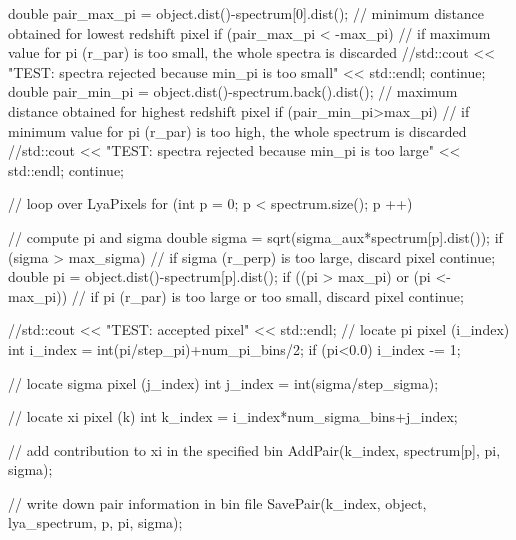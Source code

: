 \begin{DoxyCode}
{{{{                double pair_max_pi = object.dist()-spectrum[0].dist(); //
       minimum distance obtained for lowest redshift pixel
                if (pair_max_pi < -max_pi) { // if maximum value for pi (r_par)
       is too small, the whole spectra is discarded
                    //std::cout << "TEST: spectra rejected because min_pi is
       too small" << std::endl;
                    continue;
                }
                double pair_min_pi = object.dist()-spectrum.back().dist(); //
       maximum distance obtained for highest redshift pixel
                if (pair_min_pi>max_pi){ // if minimum value for pi (r_par) is
       too high, the whole spectrum is discarded
                    //std::cout << "TEST: spectra rejected because min_pi is
       too large" << std::endl;
                    continue;
                }
                
                // loop over LyaPixels
                for (int p = 0; p < spectrum.size(); p ++){
                    
                    // compute pi and sigma
                    double sigma = sqrt(sigma_aux*spectrum[p].dist());
                    if (sigma > max_sigma){ // if sigma (r_perp) is too large,
       discard pixel
                        continue;
                    }
                    double pi = object.dist()-spectrum[p].dist();
                    if ((pi > max_pi) or (pi <- max_pi)){ // if pi (r_par) is
       too large or too small, discard pixel
                        continue;
                    }
                    
                    //std::cout << "TEST: accepted pixel" << std::endl;
                    // locate pi pixel (i_index)
                    int i_index = int(pi/step_pi)+num_pi_bins/2;
                    if (pi<0.0){
                        i_index -= 1;
                    }
                    
                    // locate sigma pixel (j_index)
                    int j_index = int(sigma/step_sigma);
                    
                    // locate xi pixel (k)
                    int k_index = i_index*num_sigma_bins+j_index;
                    
                    // add contribution to xi in the specified bin
                    AddPair(k_index, spectrum[p], pi, sigma);
                    
                    // write down pair information in bin file
                    SavePair(k_index, object, lya_spectrum, p, pi, sigma);
                }
            }
        }
    }
}
\end{DoxyCode}
